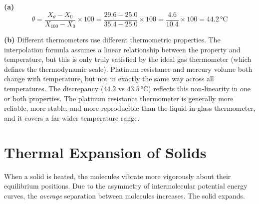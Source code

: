 \begin{solutionbox}
\textbf{(a)}
\[
  \theta = \frac{X_\theta - X_0}{X_{100} - X_0}
  \times 100
  = \frac{29.6 - 25.0}{35.4 - 25.0} \times 100
  = \frac{4.6}{10.4} \times 100
  = 44.2\,°\text{C}
\]

\textbf{(b)} Different thermometers use different
thermometric properties. The interpolation formula
assumes a linear relationship between the property
and temperature, but this is only truly satisfied by
the ideal gas thermometer (which defines the
thermodynamic scale). Platinum resistance and mercury
volume both change with temperature, but not in
exactly the same way across all temperatures. The
discrepancy ($44.2$ vs $43.5\,°$C) reflects this
non-linearity in one or both properties. The platinum
resistance thermometer is generally more reliable,
more stable, and more reproducible than the
liquid-in-glass thermometer, and it covers a far
wider temperature range.
\end{solutionbox}

\section{Thermal Expansion of Solids}

When a solid is heated, the molecules vibrate more
vigorously about their equilibrium positions. Due to
the asymmetry of intermolecular potential energy
curves, the \textit{average} separation between
molecules increases. The solid expands.

